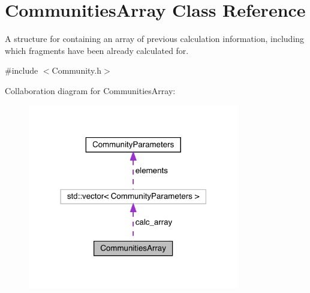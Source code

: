 \hypertarget{struct_communities_array}{}\section{Communities\+Array Class Reference}
\label{struct_communities_array}


A structure for containing an array of previous calculation information, including which fragments have been already calculated for.  




{\ttfamily \#include $<$Community.\+h$>$}



Collaboration diagram for Communities\+Array\+:\nopagebreak
\begin{figure}[H]
\begin{center}
\leavevmode
\includegraphics[width=262pt]{struct_communities_array__coll__graph}
\end{center}
\end{figure}
